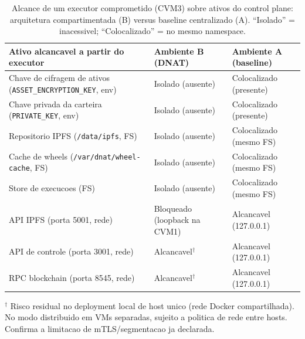 \begin{table}[t]
\centering
\caption{Alcance de um executor comprometido (CVM3) sobre ativos do control plane: arquitetura compartimentada (B) versus baseline centralizado (A). ``Isolado'' = inacessivel; ``Colocalizado'' = no mesmo namespace.}
\label{tab:blast-radius}
\footnotesize
\begin{tabularx}{\textwidth}{@{}Xp{3.4cm}p{3.4cm}@{}}
\toprule
Ativo alcancavel a partir do executor & Ambiente B (DNAT) & Ambiente A (baseline) \\
\midrule
Chave de cifragem de ativos (\texttt{ASSET\_ENCRYPTION\_KEY}, env) & Isolado (ausente) & Colocalizado (presente) \\
Chave privada da carteira (\texttt{PRIVATE\_KEY}, env) & Isolado (ausente) & Colocalizado (presente) \\
Repositorio IPFS (\texttt{/data/ipfs}, FS) & Isolado (ausente) & Colocalizado (mesmo FS) \\
Cache de wheels (\texttt{/var/dnat/wheel-cache}, FS) & Isolado (ausente) & Colocalizado (mesmo FS) \\
Store de execucoes (FS) & Isolado (ausente) & Colocalizado (mesmo FS) \\
API IPFS (porta 5001, rede) & Bloqueado (loopback na CVM1) & Alcancavel (127.0.0.1) \\
API de controle (porta 3001, rede) & Alcancavel$^{\dagger}$ & Alcancavel (127.0.0.1) \\
RPC blockchain (porta 8545, rede) & Alcancavel$^{\dagger}$ & Alcancavel (127.0.0.1) \\
\bottomrule
\end{tabularx}
\par\smallskip
{\footnotesize $^{\dagger}$ Risco residual no deployment local de host unico (rede Docker compartilhada). No modo distribuido em VMs separadas, sujeito a politica de rede entre hosts. Confirma a limitacao de mTLS/segmentacao ja declarada.}
\end{table}

